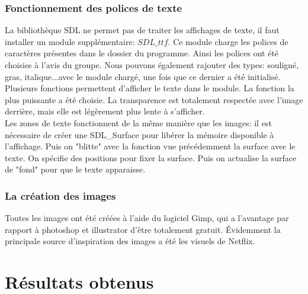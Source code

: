 \documentclass[light]{ceri}
\begin{document}
\subsubsection{Fonctionnement des polices de texte}
\indent La bibliothèque SDL ne permet pas de traiter les affichages de texte, il faut installer un module supplémentaire: \begin{math}SDL\_ttf\end{math}. Ce module charge les polices de caractères présentes dans le dossier du programme. Ainsi les polices ont été choisies à l'avis du groupe. Nous pouvons également rajouter des types: souligné, gras, italique...avec le module chargé, une fois que ce dernier a été initialisé. \\
Plusieurs fonctions permettent d'afficher le texte dans le module. La fonction la plus puissante a été choisie. La transparence est totalement respectée avec l'image derrière, mais elle est légèrement plus lente à s'afficher. \\
\indent Les zones de texte fonctionnent de la même manière que les images: il est nécessaire de créer une SDL\_Surface pour libérer la mémoire disponible à l'affichage. Puis on "blitte" avec la fonction vue précédemment la surface avec le texte. On spécifie des positions pour fixer la surface. Puis on actualise la surface de "fond" pour que le texte apparaisse.\\
\subsubsection{La création des images}
Toutes les images ont été créées à l'aide du logiciel Gimp, qui a l'avantage par rapport à photoshop et illustrator d'être totalement gratuit. Évidemment la principale source d'inspiration des images a été les visuels de Netflix.\\


\section{Résultats obtenus}
\end{document}

